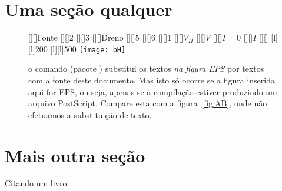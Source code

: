 \lipsum[1]\cite{Desrat:2006}

\section{Uma seção qualquer}

\lipsum[2-3]

\begin{figure}
	\centering
	[][]{Fonte}
	[][]{$2$}
	[][]{$3$}
	[][]{Dreno}
	[][]{$5$}
	[][]{$6$}
	\psfrag{1mm}[][]{\unit{1}{\milli\metre}}
	[][]{$V_H$}
	[][]{$V$}
	[][]{$I = 0$}
	[][]{$I$}
	[][]{}
	[l]{\unit{200}{\micro\metre}}
	[l]{\unit{500}{\micro\metre}}
	\texttt{[image: bH]}
	\caption[Legenda curta]{o comando  (pacote ) substitui os textos \emph{na figura EPS} por textos com a fonte deste documento. Mas isto só ocorre se a figura inserida aqui for EPS, ou seja, apenas se a compilação estiver produzindo um arquivo PostScript. Compare esta com a figura~\ref{fig:AB}, onde não efetuamos a substituição de texto.}
	\label{fig:if}
\end{figure}

\lipsum[4-5]

\section{Mais outra seção}

\lipsum[6]

Citando um livro: \cite{Eisberg:2000}

\lipsum[7-9]